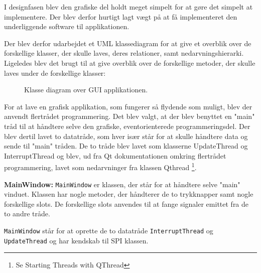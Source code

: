 I designfasen blev den grafiske del holdt meget simpelt for at gøre det simpelt at implementere. Der blev derfor hurtigt lagt vægt på at få implementeret den underliggende software til applikationen.

 Der blev derfor udarbejdet et UML klassediagram for at give et overblik over de forskellige klasser, der skulle laves, deres relationer, samt nedarvningshierarki. Ligeledes blev det brugt til at give overblik over de forskellige metoder, der skulle laves under de forskellige klasser:

\begin{figure}[H]
\centering
{}
\caption[Figur]{Klasse diagram over GUI applikationen.}
\label{fig:klasse_diagram}
\end{figure}

For at lave en grafisk applikation, som fungerer så flydende som muligt, blev der anvendt flertrådet programmering. Det blev valgt, at der blev benyttet en "main" tråd til at håndtere selve den grafiske, eventorienterede programmeringsdel. Der blev dertil lavet to datatråde, som hver især står for at skulle håndtere data og sende til "main" tråden. De to tråde blev lavet som klasserne UpdateThread og InterruptThread og blev, ud fra Qt dokumentationen omkring flertrådet programmering, lavet som nedarvninger fra klassen Qthread \footnote{Se Starting Threads with QThread\cite{Qthread}}.


\textbf{MainWindow:}
\texttt{MainWindow} er klassen, der står for at håndtere selve "main" vinduet. Klassen har nogle metoder, der håndterer de to trykknapper samt nogle forskellige slots. De forskellige slots anvendes til at fange signaler emittet fra de to andre tråde. 

\texttt{MainWindow} står for at oprette de to datatråde \texttt{InterruptThread} og \texttt{UpdateThread} og har kendskab til SPI klassen.

